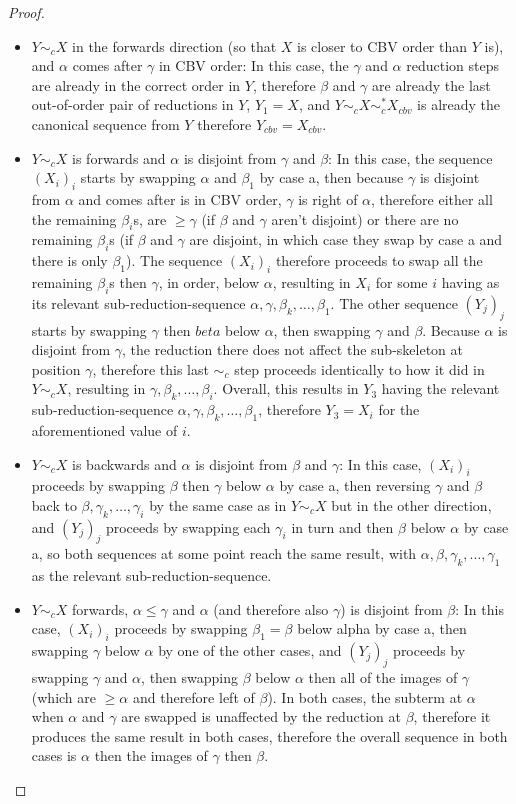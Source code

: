 \documentclass{article}
\theoremstyle{definition}
\theoremstyle{lemma}
\theoremstyle{remark}
\begin{document}
\begin{proof}
\begin{itemize}
\item $Y \sim_c X$ in the forwards direction (so that $X$ is closer to CBV order than $Y$ is), and $\alpha$ comes after $\gamma$ in CBV order: In this case, the $\gamma$ and $\alpha$ reduction steps are already in the correct order in $Y$, therefore $\beta$ and $\gamma$ are already the last out-of-order pair of reductions in $Y$, $Y_1 = X$, and $Y \sim_c X \sim_c^* X_{cbv}$ is already the canonical sequence from $Y$ therefore $Y_{cbv} = X_{cbv}$.
\item $Y \sim_c X$ is forwards and $\alpha$ is disjoint from $\gamma$ and $\beta$: In this case, the sequence $(X_i)_i$ starts by swapping $\alpha$ and $\beta_1$ by case a, then because $\gamma$ is disjoint from $\alpha$ and comes after is in CBV order, $\gamma$ is right of $\alpha$, therefore either all the remaining $\beta_i$s, are $\geq \gamma$ (if $\beta$ and $\gamma$ aren't disjoint) or there are no remaining $\beta_i$s (if $\beta$ and $\gamma$ are disjoint, in which case they swap by case a and there is only $\beta_1$). The sequence $(X_i)_i$ therefore proceeds to swap all the remaining $\beta_i$s then $\gamma$, in order, below $\alpha$, resulting in $X_i$ for some $i$ having as its relevant sub-reduction-sequence $\alpha, \gamma, \beta_k, \dots, \beta_1$. The other sequence $(Y_j)_j$ starts by swapping $\gamma$ then $beta$ below $\alpha$, then swapping $\gamma$ and $\beta$. Because $\alpha$ is disjoint from $\gamma$, the reduction there does not affect the sub-skeleton at position $\gamma$, therefore this last $\sim_c$ step proceeds identically to how it did in $Y \sim_c X$, resulting in $\gamma, \beta_k, \dots, \beta_i$. Overall, this results in $Y_3$ having the relevant sub-reduction-sequence $\alpha, \gamma, \beta_k, \dots, \beta_1$, therefore $Y_3 = X_i$ for the aforementioned value of $i$.
\item $Y \sim_c X$ is backwards and $\alpha$ is disjoint from $\beta$ and $\gamma$: In this case, $(X_i)_i$ proceeds by swapping $\beta$ then $\gamma$ below $\alpha$ by case a, then reversing $\gamma$ and $\beta$ back to $\beta, \gamma_k, \dots, \gamma_i$ by the same case as in $Y \sim_c X$ but in the other direction, and $(Y_j)_j$ proceeds by swapping each $\gamma_i$ in turn and then $\beta$ below $\alpha$ by case a, so both sequences at some point reach the same result, with $\alpha, \beta, \gamma_k, \dots, \gamma_1$ as the relevant sub-reduction-sequence.
\item $Y \sim_c X$ forwards, $\alpha \leq \gamma$ and $\alpha$ (and therefore also $\gamma$) is disjoint from $\beta$: In this case, $(X_i)_i$ proceeds by swapping $\beta_1 = \beta$ below alpha by case a, then swapping $\gamma$ below $\alpha$ by one of the other cases, and $(Y_j)_j$ proceeds by swapping $\gamma$ and $\alpha$, then swapping $\beta$ below $\alpha$ then all of the images of $\gamma$ (which are $\geq \alpha$ and therefore left of $\beta$). In both cases, the subterm at $\alpha$ when $\alpha$ and $\gamma$ are swapped is unaffected by the reduction at $\beta$, therefore it produces the same result in both cases, therefore the overall sequence in both cases is $\alpha$ then the images of $\gamma$ then $\beta$.

\end{itemize}
\end{proof}
\end{document}
